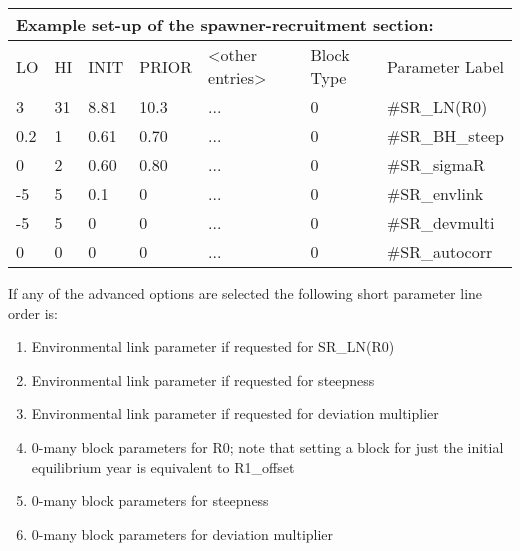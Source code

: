 \begin{center}
	\begin{longtable}{p{1cm} p{1cm} p{1cm}  p{1.5cm}  p{3cm}  p{2.5cm}  p{3cm}  }
		
		\multicolumn{7}{l}{Example set-up of the spawner-recruitment section:}\\
		\hline
		LO & HI & INIT & PRIOR &  <other entries> & Block Type & Parameter Label \\
		\hline
		3    & 31 & 8.81 & 10.3 & ... & 0 & \#SR\_LN(R0) \\
		0.2  & 1  & 0.61 & 0.70 & ... & 0 & \#SR\_BH\_steep \\
		0    & 2  & 0.60 & 0.80 & ... & 0 & \#SR\_sigmaR \\
		-5   & 5  & 0.1  & 0    & ... & 0 & \#SR\_envlink \\
		-5   & 5  & 0    & 0    & ... & 0 & \#SR\_devmulti\\
		0    & 0  & 0    & 0    & ... & 0 & \#SR\_autocorr  \\
		\hline
	\end{longtable}
\end{center}

\noindent If any of the advanced options are selected the following short parameter line order is:
\begin{enumerate}
	\item Environmental link parameter if requested for SR\_LN(R0)
	\item Environmental link parameter if requested for steepness
	\item Environmental link parameter if requested for deviation multiplier
	\item 0-many block parameters for R0; note that setting a block for just the initial equilibrium year is equivalent to R1\_offset
	\item 0-many block parameters for steepness
	\item 0-many block parameters for deviation multiplier
\end{enumerate}

